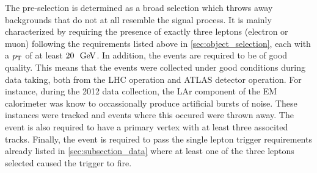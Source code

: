 The pre-selection is determined as a broad selection which throws
away backgrounds that do not at all resemble the signal process.
It is mainly characterized by requiring the presence of exactly three leptons
(electron or muon) following the requirements listed above in 
\sec\ref{sec:object_selection}, each with a $p_{\mathrm{T}}$ of at least $20~\GeV$.
In addition, the events are required to be of good quality. This means
that the events were collected under good conditions during data taking,
both from the LHC operation and ATLAS detector operation. For instance,
during the 2012 data collection, the LAr component of the EM calorimeter
was know to occassionally produce artificial bursts of noise. These instances
were tracked and events where this occured were thrown away. The event is 
also required to have a primary vertex with at least three associted tracks.
Finally, the event is required to pass the single lepton trigger
requirements already listed in \sec\ref{sec:subsection_data} where 
at least one of the three leptons selected caused the trigger to fire.
